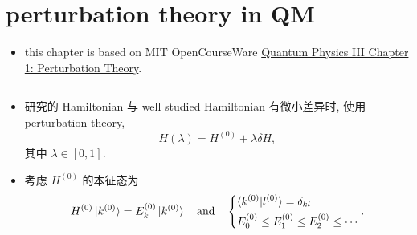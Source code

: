 \chapter{perturbation theory in QM}
\begin{itemize}
	\item this chapter is based on MIT OpenCourseWare \href{https://ocw.mit.edu/courses/8-06-quantum-physics-iii-spring-2018/resources/mit8_06s18ch1/}{Quantum Physics III Chapter 1: Perturbation Theory}.
	
	\noindent\rule[0.5ex]{\linewidth}{0.5pt} %
	
	\item 研究的 Hamiltonian 与 well studied Hamiltonian 有微小差异时, 使用 perturbation theory,
	\begin{equation}
		H(\lambda) = H^{(0)} + \lambda \delta H,
	\end{equation}
	其中 $\lambda \in [0, 1]$.
	
	\item 考虑 $H^{(0)}$ 的本征态为
	\begin{equation}
		H^{(0)} \ket{k^{(0)}} = E_k^{(0)} \ket{k^{(0)}} \quad \text{and} \quad \begin{dcases}
			\braket{k^{(0)} | l^{(0)}} = \delta_{k l} \\
			E_0^{(0)} \leq E_1^{(0)} \leq E_2^{(0)} \leq \cdots
		\end{dcases}.
	\end{equation}
\end{itemize}

